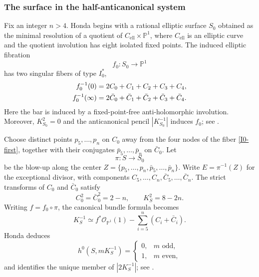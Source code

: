 \documentclass[11pt]{amsart}
\numberwithin{equation}{section}
\def\mc{\mathcal}
\theoremstyle{plain}
\theoremstyle{definition}
\begin{document}
\subsubsection{The surface in the half-anticanonical system}

Fix an integer $n>4$.  Honda begins with a rational elliptic surface $S_0$
obtained as the minimal resolution of a quotient of $C_{\mathrm{ell}}\times\mathbb P^1$, where
$C_{\mathrm{ell}}$ is an elliptic curve and the quotient involution has eight isolated fixed
points.  The induced elliptic fibration
\[
 f_0:S_0\longrightarrow\mathbb P^1
\]
has two singular fibers of type $I_0^*$,
\begin{align}
 f_0^{-1}(0)&=2C_0+C_1+C_2+C_3+C_4,\label{I0-first}\\
 f_0^{-1}(\infty)&=2\bar C_0+\bar C_1+\bar C_2+\bar C_3+\bar C_4.\notag %
\end{align}
Here the bar is induced by a fixed-point-free anti-holomorphic involution.
Moreover, $K_{S_0}^2=0$ and the anticanonical pencil $|K_{S_0}^{-1}|$
induces $f_0$; see \cite[Proposition 2.1]{Hn15}.

Choose distinct points $p_5,\ldots,p_n$ on $C_0$ away from the four nodes of
the fiber \eqref{I0-first}, together with their conjugates
$\bar p_5,\ldots,\bar p_n$ on $\bar C_0$.  Let
\begin{equation*}%
 \pi:S\longrightarrow S_0
\end{equation*}
be the blow-up along the center
$Z=\{p_5,\ldots,p_n,\bar p_5,\ldots,\bar p_n\}$.  Write
$E=\pi^{-1}(Z)$ for the exceptional divisor, with components
$C_5,\ldots,C_n,\bar C_5,\ldots,\bar C_n$.  The strict transforms of $C_0$
and $\bar C_0$ satisfy
\begin{equation*}%
 C_0^2=\bar C_0^2=2-n,\qquad K_S^2=8-2n.
\end{equation*}
Writing $f=f_0\circ\pi$, the canonical bundle formula becomes
\begin{equation*}%
 K_S^{-1}\simeq f^*\mc O_{\mathbb P^1}(1)
 -\sum_{i=5}^{n}(C_i+\bar C_i).
\end{equation*}
Honda deduces
\begin{equation*}%
 h^0(S,mK_S^{-1})=
 \begin{cases}
 0,&m\text{ odd},\\
 1,&m\text{ even},
 \end{cases}
\end{equation*}
and identifies the unique member of $|2K_S^{-1}|$; see
\cite[Proposition 2.2 and equations (2.5)--(2.10)]{Hn15}.
\end{document}
